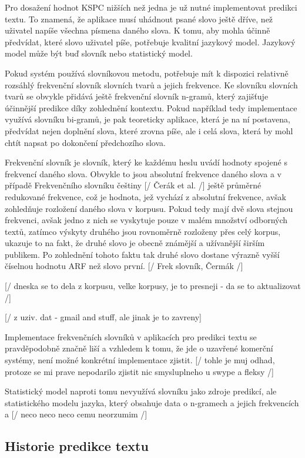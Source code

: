 \documentclass{article}
\begin{document}
Pro dosažení hodnot KSPC nižších než jedna je už nutné implementovat predikci textu. To znamená, že aplikace musí uhádnout psané slovo ještě dříve, než uživatel napíše všechna písmena daného slova. K tomu, aby mohla účinně předvídat, které slovo uživatel píše, potřebuje kvalitní jazykový model. Jazykový model může být buď slovník nebo statistický model. 

Pokud systém používá slovníkovou metodu, potřebuje mít k dispozici relativně rozsáhlý frekvenční slovník slovních tvarů a jejich frekvence. Ke slovníku slovních tvarů se obvykle přidává ještě frekvenční slovník n-gramů, který zajišťuje účinnější predikce díky zohlednění kontextu. Pokud například tedy implementace využívá slovníku bi-gramů, je pak teoreticky aplikace, která je na ní postavena, předvídat nejen doplnění slova, které zrovna píše, ale i celá slova, která by mohl chtít napsat po dokončení předchozího slova.

Frekvenční slovník je slovník, který ke každému heslu uvádí hodnoty spojené s frekvencí daného slova. Obvykle to jsou absolutní frekvence daného slova a v případě Frekvenčního slovníku češtiny [/ Čerák et al. /] ještě průměrné redukované frekvence, což je hodnota, jež vychází z absolutní frekvence, avšak zohledňuje rozložení daného slova v korpusu. Pokud tedy mají dvě slova stejnou frekvenci, avšak jedno z nich se vyskytuje pouze v malém množství odborných textů, zatímco výskyty druhého jsou rovnoměrně rozloženy přes celý korpus, ukazuje to na fakt, že druhé slovo je obecně známější a užívanější širším publikem. Po zohlednění tohoto faktu tak druhé slovo dostane výrazně vyšší číselnou hodnotu ARF než slovo první. [/ Frek slovník, Čermák /]

[/ dneska se to dela z korpusu, velke korpusy, je to presneji - da se to aktualizovat /]

[/ z uziv. dat - gmail and stuff, ale jinak je to zavreny]

Implementace frekvenčních slovníků v aplikacích pro predikci textu se pravděpodobně značně liší a vzhledem k tomu, že jde o uzavřené komerční systémy, není možné konkrétní implementace zjistit. [/ tohle je muj odhad, protoze se mi prave nepodarilo zjistit nic smysluplneho u swype a fleksy /] 

Statistický model naproti tomu nevyužívá slovníku jako zdroje predikcí, ale statistického modelu jazyka, který obsahuje data o n-gramech a jejich frekvencích a [/ neco neco neco cemu neorzumim /]


\subsection{Historie predikce textu}
\end{document}
